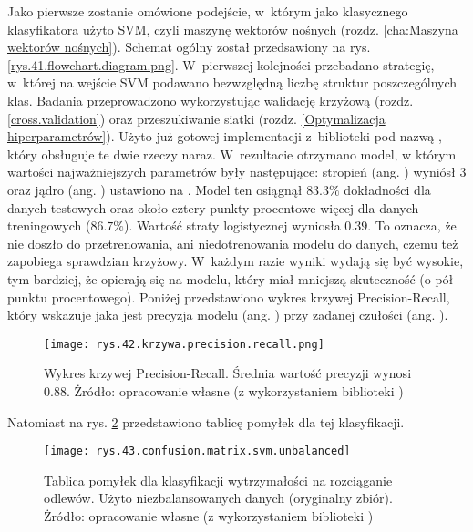 Jako pierwsze zostanie omówione podejście, w~którym jako klasycznego klasyfikatora użyto SVM, czyli maszynę wektorów nośnych (rozdz. \ref{cha:Maszyna wektorów nośnych}). Schemat ogólny został przedsawiony na rys. \ref{rys.41.flowchart.diagram.png}. W~pierwszej kolejności przebadano strategię, w~której na wejście SVM podawano bezwzględną liczbę struktur poszczególnych klas. Badania przeprowadzono wykorzystując walidację krzyżową (rozdz. \ref{cross.validation}) oraz przeszukiwanie siatki (rozdz. \ref{Optymalizacja hiperparametrów}). Użyto już gotowej implementacji z~biblioteki  pod nazwą , który obsługuje te dwie rzeczy naraz. W~rezultacie otrzymano model, w którym wartości najważniejszych parametrów były następujące: stropień (ang. ) wyniósł 3 oraz jądro (ang. ) ustawiono na . Model ten osiągnął $83.3\%$ dokładności dla danych testowych oraz około cztery punkty procentowe więcej dla danych treningowych ($86.7\%$). Wartość straty logistycznej wyniosła $0.39$. To oznacza, że nie doszło do przetrenowania, ani niedotrenowania modelu do danych, czemu też zapobiega sprawdzian krzyżowy. W~każdym razie wyniki wydają się być wysokie, tym bardziej, że opierają się na modelu, który miał mniejszą skuteczność (o pół punktu procentowego). Poniżej przedstawiono wykres krzywej Precision-Recall, który wskazuje jaka jest precyzja modelu (ang. ) przy zadanej czułości (ang. ). 
\begin{figure}[h]
    \centering
    \texttt{[image: rys.42.krzywa.precision.recall.png]}
    \caption{Wykres krzywej Precision-Recall. Średnia wartość precyzji wynosi 0.88. Żródło: opracowanie własne (z wykorzystaniem biblioteki )}
    \label{rys.42.krzywa.precision.recall.png}
\end{figure}
Natomiast na rys. \ref{rys.43.confusion.matrix.svm.unbalanced} przedstawiono tablicę pomyłek dla tej klasyfikacji.
\begin{figure}[h]
    \centering
    \texttt{[image: rys.43.confusion.matrix.svm.unbalanced]}
    \caption{Tablica pomyłek dla klasyfikacji wytrzymałości na rozciąganie odlewów. Użyto niezbalansowanych danych (oryginalny zbiór). Żródło: opracowanie własne (z wykorzystaniem biblioteki )}
    \label{rys.43.confusion.matrix.svm.unbalanced}
\end{figure}

